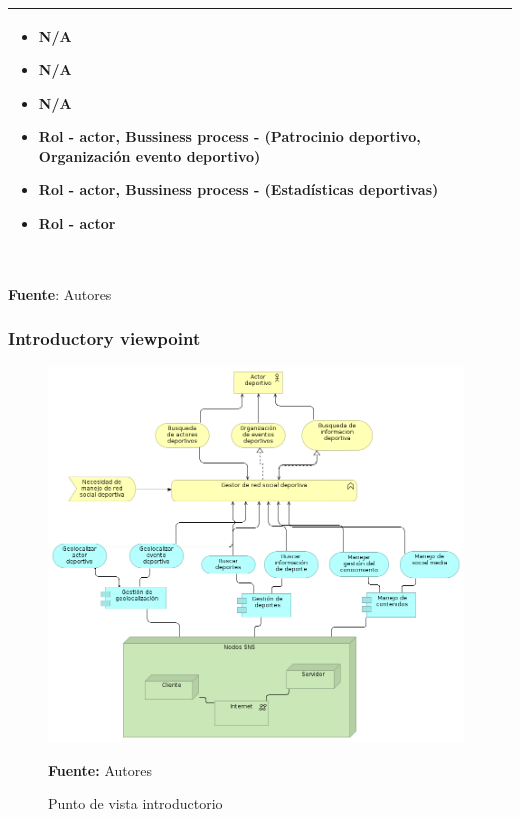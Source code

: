 \begin{table}[!htb]
\begin{center}
{\begin{tabular}{|p{7cm}|p{4cm}|}
\begin{itemize}
				\item N/A
				\item N/A
				\item N/A
				\item Rol - actor, Bussiness process - (Patrocinio deportivo, Organización evento deportivo)
				\item Rol - actor, Bussiness process - (Estadísticas deportivas)
				\item Rol - actor
			\end{itemize} 
			\\
			\hline
		\end{tabular}
		} \\
		\textbf{Fuente}: Autores
	\end{center}
\end{table}

\subsubsection{Introductory viewpoint}

\begin{figure}[!htb]
  \begin{center}
    \includegraphics[width=11cm]{./imagenes/introductory.png}
    \caption{Punto de vista introductorio}
    \label{fig:introductory}
    \textbf{Fuente:}  Autores
  \end{center}
\end{figure}

